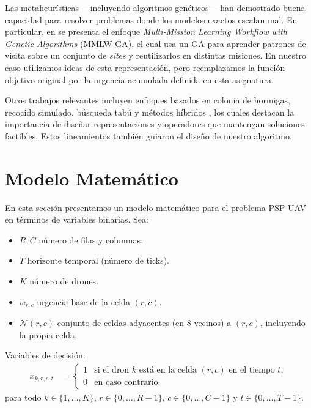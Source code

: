 \documentclass[11pt,a4paper]{article}
\begin{document}
Las metaheurísticas —incluyendo algoritmos genéticos— han demostrado buena capacidad para resolver problemas donde los modelos exactos escalan mal. En particular, en \cite{mmlwga2023} se presenta el enfoque \emph{Multi-Mission Learning Workflow with Genetic Algorithms} (MMLW-GA), el cual usa un GA para aprender patrones de visita sobre un conjunto de \emph{sites} y reutilizarlos en distintas misiones. En nuestro caso utilizamos ideas de esta representación, pero reemplazamos la función objetivo original por la urgencia acumulada definida en esta asignatura.

Otros trabajos relevantes incluyen enfoques basados en colonia de hormigas, recocido simulado, búsqueda tabú y métodos híbridos \cite{prosser1993hybrid, uavsurvey2020}, los cuales destacan la importancia de diseñar representaciones y operadores que mantengan soluciones factibles. Estos lineamientos también guiaron el diseño de nuestro algoritmo.



\section{Modelo Matemático}
\label{sec:modelo}

En esta sección presentamos un modelo matemático para el problema PSP-UAV en términos de variables binarias. Sea:
\begin{itemize}
    \item $R,C$ número de filas y columnas.
    \item $T$ horizonte temporal (número de ticks).
    \item $K$ número de drones.
    \item $w_{r,c}$ urgencia base de la celda $(r,c)$.
    \item $\mathcal{N}(r,c)$ conjunto de celdas adyacentes (en 8 vecinos) a $(r,c)$, incluyendo la propia celda.
\end{itemize}

Variables de decisión:
\begin{align}
    x_{k,r,c,t} &=
    \begin{cases}
        1 & \text{si el dron $k$ está en la celda $(r,c)$ en el tiempo $t$},\\
        0 & \text{en caso contrario,}
    \end{cases}
\end{align}
para todo $k \in \{1,\dots,K\}$, $r \in \{0,\dots,R-1\}$, $c \in \{0,\dots,C-1\}$ y $t \in \{0,\dots,T-1\}$.
\end{document}
